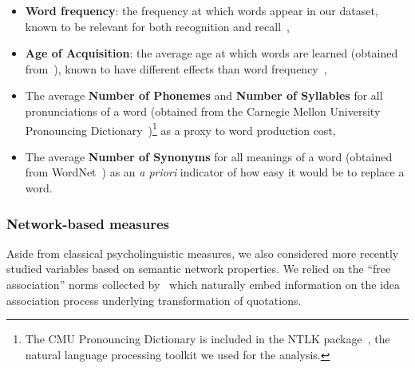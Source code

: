\begin{itemize}
    \item \textbf{Word frequency}: the frequency at which words appear in our dataset, known to be relevant for both recognition and recall~\citep{gregg1976word},
    \item \textbf{Age of Acquisition}: the average age at which words are learned (obtained from~\citet{Kuperman12}), known to have different effects than word frequency~\citep{morrison1995roles,dewhurst1998separate},
    \item The average \textbf{Number of Phonemes} and \textbf{Number of Syllables} for all pronunciations of a word (obtained from the Carnegie Mellon University Pronouncing Dictionary~\citep{Weide98})\footnote{The CMU Pronouncing Dictionary is included in the NTLK package~\citep{Bird09}, the natural language processing toolkit we used for the analysis.} as a proxy to word production cost,
    \item The average \textbf{Number of Synonyms} for all meanings of a word (obtained from WordNet~\citep{WordNet10}) as an \emph{a priori} indicator of how easy it would be to replace a word.
\end{itemize}


\subsubsection{Network-based measures}

Aside from classical psycholinguistic measures, we also considered more recently studied variables based on semantic network properties.
We relied on the ``free association'' norms collected by~\citet{Nelson04} which naturally embed information on the idea association process underlying transformation of quotations.

